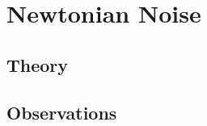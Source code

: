 \documentclass [12pt, proquest]{uwthesis}[2019]
\begin{document}
\section{Newtonian Noise}
\subsection{Theory}
\subsection{Observations}



\printendnotes
\nocite{*}   


\end{document}
